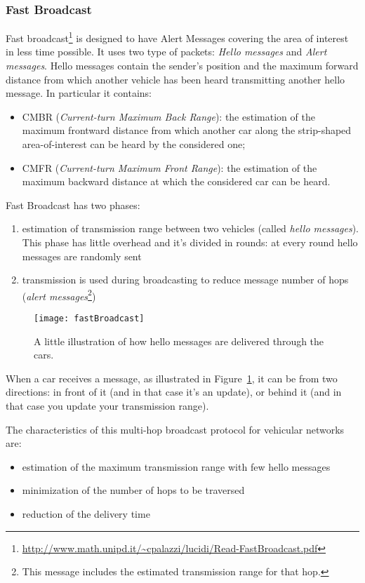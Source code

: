 \subsubsection{Fast Broadcast}
Fast broadcast\footnote{
\url{http://www.math.unipd.it/~cpalazzi/lucidi/Read-FastBroadcast.pdf}
} 
is designed to have Alert Messages covering the area of interest
in less time possible. It uses two type of packets: \textit{Hello messages} and
\textit{Alert messages}. Hello messages contain the sender's position and the
maximum forward distance from which another vehicle has been heard transmitting
another hello message. In particular it contains:
\begin{itemize}
  \item CMBR (\textit{Current-turn Maximum Back Range}): the estimation of the 
  maximum frontward distance from which another car along the strip-shaped 
  area-of-interest can be heard by the considered one;
  \item CMFR (\textit{Current-turn Maximum Front Range}): the estimation of the
  maximum backward distance at which the considered car can be heard.
\end{itemize}

Fast Broadcast has two phases:
\begin{enumerate}
\item estimation of transmission range between two vehicles (called
  \textit{hello messages}). This phase has little overhead and it's divided in
  rounds: at every round
  hello messages are randomly sent
\item transmission is used during broadcasting to reduce message number of hops
  (\textit{alert messages}\footnote{This message includes the estimated
  transmission range for that hop.})
\end{enumerate}

\begin{figure}
  \centering
  \texttt{[image: fastBroadcast]}
  \caption[Hello Message propagation]{A little illustration of how hello
    messages are delivered through the cars.}
  \label{fig:802.11ws:helloMessageDelivery}
\end{figure}

When a car receives a message, as illustrated in
Figure~\ref{fig:802.11ws:helloMessageDelivery}, it can be from two directions:
in front of it (and in that case it's an update), or behind it (and in that case
you update your transmission range).

The characteristics of this multi-hop broadcast protocol for vehicular networks
are:
\begin{itemize}
\item estimation of the maximum transmission range with few hello messages
\item minimization of the number of hops to be traversed
\item reduction of the delivery time
\end{itemize}

